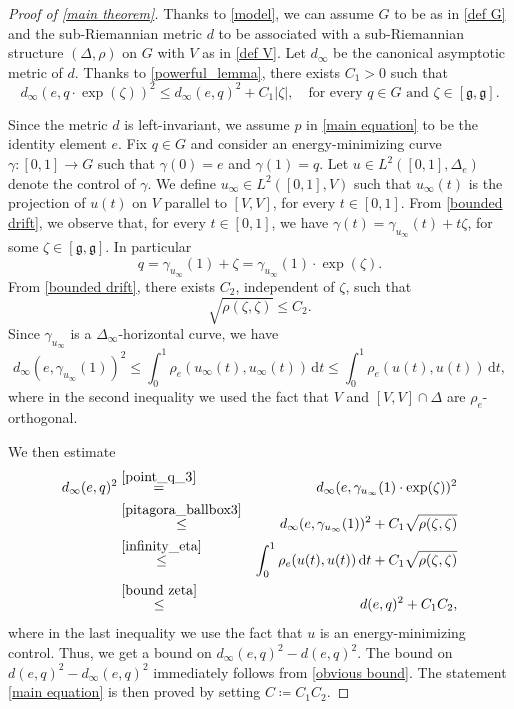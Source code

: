 \documentclass[a4paper,11pt,reqno]{amsart}
\theoremstyle{plain}
\theoremstyle{definition}
\newcommand{\g}{\mathfrak{g}}
\newcommand{\id}{e}
\newcommand{\de}{\mathrm{d}}
\newcommand{\coloneq}{\coloneqq}
\begin{document}
\begin{proof}[Proof of \cref{main theorem}]
 Thanks to \cref{model}, we can assume $G$ to be as in \eqref{def G} and the sub-Riemannian metric $d$ to be associated with a sub-Riemannian structure $(\Delta,\rho)$ on $G$ with $V$ as in \eqref{def V}. Let $d_\infty$ be the canonical asymptotic metric of $d$. Thanks to \cref{powerful_lemma}, there exists $C_1>0$ such that 
 \begin{equation} \label{pitagora_ballbox3}
 d_\infty(e,q \cdot \exp(\zeta))^2 \le d_\infty(e,q)^2 + C_1 \lvert \zeta \rvert, \quad \text{for every $q \in G$ and $\zeta \in [\g,\g]$.}
 \end{equation}

 Since the metric $d$ is left-invariant, we assume $p$ in \eqref{main equation} to be the identity element $e$. Fix $q \in G$ and consider an energy-minimizing curve $\gamma \colon [0,1] \to G$ such that $\gamma(0)=\id$ and $\gamma(1)=q$. Let $u \in L^2([0,1],\Delta_\id)$ denote the control of $\gamma$. We define $u_\infty \in L^2([0,1],V)$ such that $u_\infty(t)$ is the projection of $u(t)$ on $V$ parallel to $[V,V]$, for every $t \in [0,1]$. From \cref{bounded drift}, we observe that, for every $t \in [0,1]$, we have $\gamma(t)=\gamma_{u_\infty}(t)+t\zeta$, for some $\zeta \in [\g,\g]$. In particular
\begin{equation} \label{point_q_3}
 q = \gamma_{u_\infty}(1) + \zeta = \gamma_{u_\infty}(1) \cdot \exp(\zeta).
\end{equation}
From \cref{bounded drift}, there exists $C_2$, independent of $\zeta$, such that
\begin{equation} \label{bound zeta}
 \sqrt{\rho(\zeta,\zeta)} \le C_2.
\end{equation}
Since $\gamma_{u_\infty}$ is a $\Delta_\infty$-horizontal curve, we have
\begin{equation} \label{infinity_eta}
 d_\infty(e,\gamma_{u_\infty}(1))^2 \le \int^1_0 \rho_\id(u_\infty(t),u_\infty(t))\, \de t \le \int^1_0 \rho_\id(u(t),u(t))\, \de t,
\end{equation}
where in the second inequality we used the fact that $V$ and $[V,V] \cap \Delta$ are $\rho_\id$-orthogonal. 

We then estimate
\begin{eqnarray*}
 d_\infty(e,q)^2 &\stackrel{\eqref{point_q_3}}{=}& d_\infty(e, \gamma_{u_\infty}(1) \cdot \exp(\zeta))^2 \\
 &\stackrel{\eqref{pitagora_ballbox3}}{\le}& d_\infty(e, \gamma_{u_\infty}(1))^2 + C_1 \sqrt{\rho(\zeta,\zeta)} \\
 &\stackrel{\eqref{infinity_eta}}{\le}& \int^1_0 \rho_\id(u(t),u(t))\, \de t + C_1\sqrt{\rho(\zeta,\zeta)} \\
 &\stackrel{\eqref{bound zeta}}{\le}& d(e,q)^2+ C_1C_2,
\end{eqnarray*}
where in the last inequality we use the fact that $u$ is an energy-minimizing control. Thus, we get a bound on $d_\infty(e,q)^2 - d(e,q)^2$. The bound on $d(e,q)^2 - d_\infty(e,q)^2$ immediately follows from \eqref{obvious bound}. The statement \eqref{main equation} is then proved by setting $C \coloneq C_1C_2$. 


\end{proof}
\end{document}

